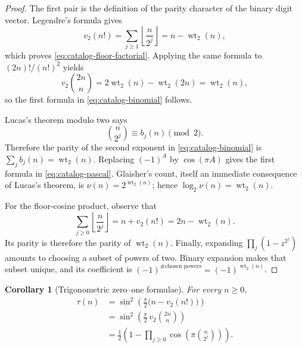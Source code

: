 \documentclass[11pt,oneside]{article}
\newtheorem{corollary}[theorem]{Corollary}
\theoremstyle{definition}
\theoremstyle{remark}
\newcommand{\wt}{\operatorname{wt}_2}
\newcommand{\vtwo}{v_2}
\begin{document}
\begin{proof}
The first pair is the definition of the parity character of the binary digit
vector.  Legendre's formula gives
\begin{equation}
 \vtwo(n!)=\sum_{j\ge1}\left\lfloor\frac{n}{2^j}\right\rfloor
          =n-\wt(n),
 \label{eq:legendre-base-two}
\end{equation}
which proves \eqref{eq:catalog-floor-factorial}.  Applying the same formula to
\((2n)!/(n!)^2\) yields
\begin{equation}
 \vtwo\binom{2n}{n}
 =2\wt(n)-\wt(2n)=\wt(n),
 \label{eq:central-valuation}
\end{equation}
so the first formula in \eqref{eq:catalog-binomial} follows.

Lucas's theorem modulo two says
\begin{equation}
 \binom{n}{2^j}\equiv b_j(n)\pmod2.
 \label{eq:lucas-power-two}
\end{equation}
Therefore the parity of the second exponent in
\eqref{eq:catalog-binomial} is \(\sum_jb_j(n)=\wt(n)\).  Replacing
\((-1)^A\) by \(\cos(\pi A)\) gives the first formula in
\eqref{eq:catalog-pascal}.  Glaisher's count, itself an immediate consequence
of Lucas's theorem, is \(\nu(n)=2^{\wt(n)}\); hence
\(\log_2\nu(n)=\wt(n)\).

For the floor-cosine product, observe that
\begin{equation}
 \sum_{j\ge0}\left\lfloor\frac{n}{2^j}\right\rfloor
 =n+\vtwo(n!)=2n-\wt(n).
 \label{eq:all-floor-sum}
\end{equation}
Its parity is therefore the parity of \(\wt(n)\).  Finally, expanding
\(\prod_j(1-z^{2^j})\) amounts to choosing a subset of powers of two.  Binary
expansion makes that subset unique, and its coefficient is
\((-1)^{\#\text{chosen powers}}=(-1)^{\wt(n)}\).
\end{proof}

\begin{corollary}[Trigonometric zero--one formulae]
\label{cor:trig-bit}
For every \(n\ge0\),
\begin{align}
 \tau(n)
 &=\sin^2\!\left(\frac{\pi}{2}\bigl(n-\vtwo(n!)\bigr)\right)
 \label{eq:tau-factorial-sine}\\
 &=\sin^2\!\left(\frac{\pi}{2}\,
          \vtwo\binom{2n}{n}\right)
 \label{eq:tau-central-sine}\\
 &=\frac12\left(1-
      \prod_{j\ge0}\cos\!\left(\pi\binom{n}{2^j}\right)\right).
 \label{eq:tau-pascal-cos}
\end{align}
\end{corollary}
\end{document}
